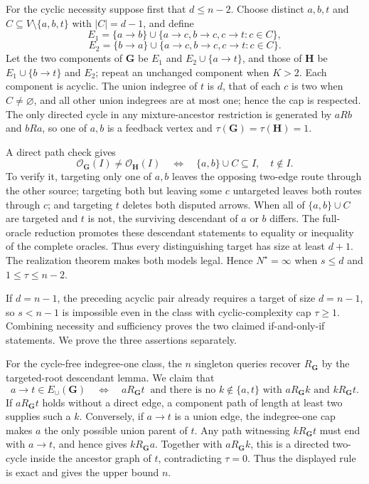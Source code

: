 For the cyclic necessity suppose first that \(d\le n-2\). Choose distinct \(a,b,t\) and \(C\subseteq V\setminus\{a,b,t\}\) with \(|C|=d-1\), and define
\[
 E_1=\{a\to b\}\cup\{a\to c,b\to c,c\to t:c\in C\},
\]
\[
 E_2=\{b\to a\}\cup\{a\to c,b\to c,c\to t:c\in C\}.
\]
Let the two components of \(\mathbf G\) be \(E_1\) and \(E_2\cup\{a\to t\}\), and those of \(\mathbf H\) be \(E_1\cup\{b\to t\}\) and \(E_2\); repeat an unchanged component when \(K>2\). Each component is acyclic. The union indegree of \(t\) is \(d\), that of each \(c\) is two when \(C\ne\varnothing\), and all other union indegrees are at most one; hence the cap is respected. The only directed cycle in any mixture-ancestor restriction is generated by \(aR b\) and \(bR a\), so one of \(a,b\) is a feedback vertex and \(\tau(\mathbf G)=\tau(\mathbf H)=1\).

A direct path check gives
\[
 \mathcal O_{\mathbf G}(I)\ne\mathcal O_{\mathbf H}(I)
 \quad\Longleftrightarrow\quad
 \{a,b\}\cup C\subseteq I,
 \quad t\notin I.
\]
To verify it, targeting only one of \(a,b\) leaves the opposing two-edge route through the other source; targeting both but leaving some \(c\) untargeted leaves both routes through \(c\); and targeting \(t\) deletes both disputed arrows. When all of \(\{a,b\}\cup C\) are targeted and \(t\) is not, the surviving descendant of \(a\) or \(b\) differs. The full-oracle reduction promotes these descendant statements to equality or inequality of the complete oracles. Thus every distinguishing target has size at least \(d+1\). The realization theorem makes both models legal. Hence \(N^{\star}=\infty\) when \(s\le d\) and \(1\le\tau\le n-2\).

If \(d=n-1\), the preceding acyclic pair already requires a target of size \(d=n-1\), so \(s<n-1\) is impossible even in the class with cyclic-complexity cap \(\tau\ge1\). Combining necessity and sufficiency proves the two claimed if-and-only-if statements.
We prove the three assertions separately.

For the cycle-free indegree-one class, the \(n\) singleton queries recover \(R_{\mathbf G}\) by the targeted-root descendant lemma. We claim that
\[
 a\to t\in E_{\cup}(\mathbf G)
 \quad\Longleftrightarrow\quad
 aR_{\mathbf G}t\ \text{ and there is no }k\notin\{a,t\}
 \text{ with }aR_{\mathbf G}k\text{ and }kR_{\mathbf G}t.
\]
If \(aR_{\mathbf G}t\) holds without a direct edge, a component path of length at least two supplies such a \(k\). Conversely, if \(a\to t\) is a union edge, the indegree-one cap makes \(a\) the only possible union parent of \(t\). Any path witnessing \(kR_{\mathbf G}t\) must end with \(a\to t\), and hence gives \(kR_{\mathbf G}a\). Together with \(aR_{\mathbf G}k\), this is a directed two-cycle inside the ancestor graph of \(t\), contradicting \(\tau=0\). Thus the displayed rule is exact and gives the upper bound \(n\).


